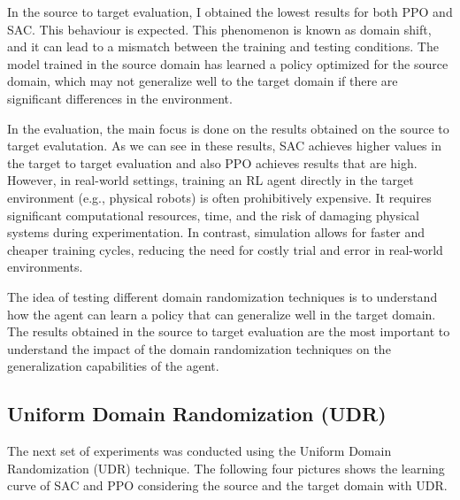 \documentclass[12pt]{article}
\begin{document}
In the source to target evaluation, I obtained the lowest results for both PPO and SAC. This behaviour is expected. This phenomenon is known as domain shift, and it can lead to a mismatch between the training and testing conditions. The model trained in the source domain has learned a policy optimized for the source domain, which may not generalize well to the target domain if there are significant differences in the environment. 

In the evaluation, the main focus is done on the results obtained on the source to target evalutation. As we can see in these results, SAC achieves higher values in the target to target evaluation and also PPO achieves results that are high. However, in real-world settings, training an RL agent directly in the target environment (e.g., physical robots) is often prohibitively expensive. It requires significant computational resources, time, and the risk of damaging physical systems during experimentation. In contrast, simulation allows for faster and cheaper training cycles, reducing the need for costly trial and error in real-world environments. 

The idea of testing different domain randomization techniques is to understand how the agent can learn a policy that can generalize well in the target domain. The results obtained in the source to target evaluation are the most important to understand the impact of the domain randomization techniques on the generalization capabilities of the agent.

\subsection{Uniform Domain Randomization (UDR)}

The next set of experiments was conducted using the Uniform Domain Randomization (UDR) technique. The following four pictures shows the learning curve of SAC and PPO considering the source and the target domain with UDR.
\end{document}
